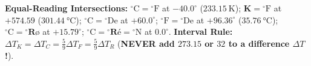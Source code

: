 \documentclass[10pt,twoside,openany,letterpaper]{book}
\begin{document}
\begin{quicksheet}
\begin{formulacard}
\begin{tabularx}{\linewidth}{@{}l c r r r r r l l r@{}}
\bottomrule
\end{tabularx}
\par\smallskip\noindent
\textbf{Equal-Reading Intersections:} $\mathbf{^\circ\mathrm{C} = {^\circ\mathrm{F}}}$ at $\mathbf{-40.0^\circ}$ ($\SI{233.15}{\kelvin}$); $\mathbf{\si{\kelvin} = {^\circ\mathrm{F}}}$ at $\mathbf{+574.59}$ ($\SI{301.44}{\celsius}$); $\mathbf{^\circ\mathrm{C} = {^\circ\mathrm{De}}}$ at $\mathbf{+60.0^\circ}$; $\mathbf{^\circ\mathrm{F} = {^\circ\mathrm{De}}}$ at $\mathbf{+96.36^\circ}$ ($\SI{35.76}{\celsius}$); $\mathbf{^\circ\mathrm{C} = {^\circ\text{R\o}}}$ at $\mathbf{+15.79^\circ}$; $\mathbf{^\circ\mathrm{C} = {^\circ\text{R\'e}} = {^\circ\mathrm{N}}}$ at $\mathbf{0.0^\circ}$. \textbf{Interval Rule:} $\Delta T_K = \Delta T_C = \frac{5}{9}\Delta T_F = \frac{5}{9}\Delta T_R$ (\textbf{NEVER add $273.15$ or $32$ to a difference $\Delta T$!}).
\end{formulacard}
\end{quicksheet}
\end{document}
